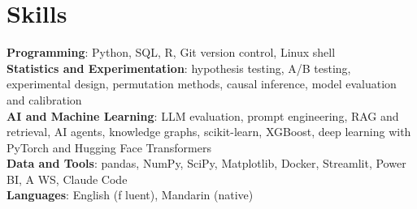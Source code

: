 \documentclass[letterpaper,11pt]{article}
\begin{document}
\section{\textbf{Skills}}
 \begin{itemize}[leftmargin=0.15in, label={}]
    \small{\item{
     \textbf{Programming}{: Python, SQL, R, Git version control, Linux shell} \\
     \textbf{Statistics and Experimentation}{: hypothesis testing, A/B testing, experimental design, permutation methods, causal inference, model evaluation and calibration} \\
     \textbf{AI and Machine Learning}{: LLM evaluation, prompt engineering, RAG and retrieval, AI agents, knowledge graphs, scikit-learn, XGBoost, deep learning with PyTorch and Hugging Face Transformers} \\
     \textbf{Data and Tools}{: pandas, NumPy, SciPy, Matplotlib, Docker, Streamlit, Power BI, A\kern0pt WS, Claude Code} \\
     \textbf{Languages}{: English (f\kern0pt luent), Mandarin (native)}}}

 \end{itemize}
\end{document}
